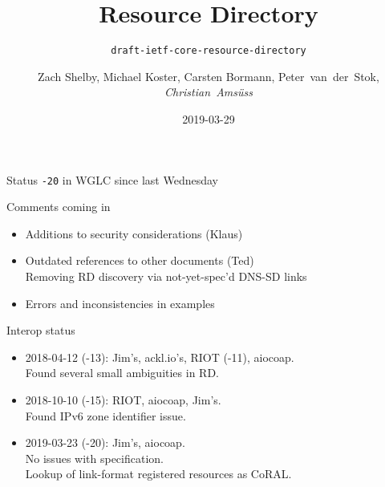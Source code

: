 \documentclass[aspectratio=169]{beamer}
\title{Resource Directory}
\subtitle{\texttt{draft-ietf-core-resource-directory}}
\author{Zach Shelby, Michael Koster, Carsten Bormann, Peter~van~der~Stok, \textit{Christian~Amsüss}}
\date{2019-03-29}
\begin{document}
\frame{\titlepage}

\begin{frame}{Status}\Large
	\texttt{-20} in WGLC since last Wednesday
\end{frame}

\begin{frame}{Comments coming in}\Large
	\begin{itemize}
		\item Additions to security considerations (Klaus)
		\item Outdated references to other documents (Ted) \\
			{\normalsize Removing RD discovery via not-yet-spec'd DNS-SD links}
		\item Errors and inconsistencies in examples
	\end{itemize}
\end{frame}

\begin{frame}{Interop status}\Large
	\begin{itemize}
		\item 2018-04-12 (-13): Jim's, ackl.io's, RIOT (-11), aiocoap.\\
			Found several small ambiguities in RD.
		\item 2018-10-10 (-15): RIOT, aiocoap, Jim's.\\
			Found IPv6 zone identifier issue.
		\item 2019-03-23 (-20): Jim's, aiocoap.\\
			No issues with specification.\\
			Lookup of link-format registered resources as CoRAL.
	\end{itemize}
\end{frame}
\end{document}
